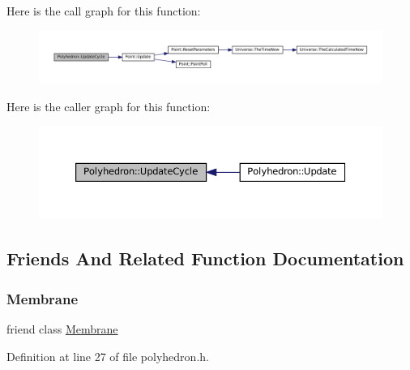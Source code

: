 Here is the call graph for this function\+:\nopagebreak
\begin{figure}[H]
\begin{center}
\leavevmode
\includegraphics[width=350pt]{class_polyhedron_a6b26174513703bc2b13f69b9cd8e1a48_cgraph}
\end{center}
\end{figure}
Here is the caller graph for this function\+:\nopagebreak
\begin{figure}[H]
\begin{center}
\leavevmode
\includegraphics[width=350pt]{class_polyhedron_a6b26174513703bc2b13f69b9cd8e1a48_icgraph}
\end{center}
\end{figure}


\subsection{Friends And Related Function Documentation}
\mbox{\label{class_polyhedron_ac790db405644a01723104c3c0c8128bb}} 
\subsubsection{\texorpdfstring{Membrane}{Membrane}}
{\footnotesize\ttfamily friend class \mbox{\hyperlink{class_membrane}{Membrane}}\hspace{0.3cm}{\ttfamily [friend]}}



Definition at line 27 of file polyhedron.\+h.

\mbox{\label{class_polyhedron_aaa07b7b364b620b9a781f30a5cd9f5ea}} 
